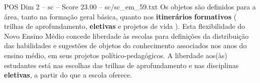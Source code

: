 \begin{textsample}{POS Dim 2 – sc – Score 23.00 – sc/sc\_em\_59.txt}
Os objetos são definidos para a área, tanto na formação geral básica, quanto nos \textbf{itinerários} \textbf{formativos} ( trilhas de aprofundamento, \textbf{eletivas} e projetos de vida ).
Esta flexibilidade do Novo Ensino Médio concede liberdade às escolas para definições da distribuição das habilidades e sugestões de objetos do conhecimento associados nos anos do ensino médio, em seus projetos político-pedagógicos.
A liberdade aos(às) estudantes está nas escolhas das trilhas de aprofundamento e nas disciplinas \textbf{eletivas}, a partir do que a escola oferece.

\end{textsample}

